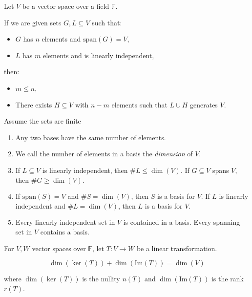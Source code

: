 \documentclass{article}
\begin{document}
\begin{theorem}
Let \( V \) be a vector space over a field \( \mathbb{F} \).

If we are given sets \( G, L \subseteq V \) such that:
\begin{itemize}
    \item \( G \) has \( n \) elements and \(\mathrm{span}(G) = V \),
    \item \( L \) has \( m \) elements and is linearly independent,
\end{itemize}
then:
\begin{itemize}
    \item \( m \leq n \),
    \item There exists \( H \subseteq V \) with \( n - m \) elements such that \( L \cup H \) generates \( V \).
\end{itemize}
\end{theorem}

\begin{theorem} Assume the sets are finite
\begin{enumerate}
    \item Any two bases have the same number of elements.
    \item We call the number of elements in a basis the \emph{dimension} of \( V \).
    \item If \( L \subseteq V \) is linearly independent, then \( \#L \leq \dim(V) \).
    If \( G \subseteq V \) spans \( V \), then \( \#G \geq \dim(V) \).
    \item If \(\mathrm{span}(S) = V \) and \( \#S = \dim(V) \), then \( S \) is a basis for \( V \).
    If \( L \) is linearly independent and \( \#L = \dim(V) \), then \( L \) is a basis for \( V \).
    \item Every linearly independent set in \( V \) is contained in a basis.
    Every spanning set in \( V \) contains a basis.
\end{enumerate}
\end{theorem}

\begin{theorem}
For \( V, W \) vector spaces over \( \mathbb{F} \), let \( T: V \to W \) be a linear transformation.

\[
\dim(\ker(T)) + \dim(\mathrm{Im}(T)) = \dim(V)
\]

where \(\dim(\ker(T))\) is the nullity \(n(T)\) and \(\dim(\mathrm{Im}(T))\) is the rank \(r(T)\).

\end{theorem}
\end{document}
